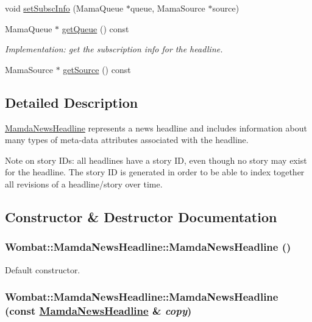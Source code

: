 \begin{CompactItemize}
void \hyperlink{classWombat_1_1MamdaNewsHeadline_e63ea9779d2d075d6bb07fa3ed8e3eae}{set\-Subsc\-Info} (Mama\-Queue $\ast$queue, Mama\-Source $\ast$source)
\item 
Mama\-Queue $\ast$ \hyperlink{classWombat_1_1MamdaNewsHeadline_47ad2837648f2babb3e6d080575e6f8b}{get\-Queue} () const 
\begin{CompactList}\small\item\em Implementation: get the subscription info for the headline. \item\end{CompactList}\item 
Mama\-Source $\ast$ \hyperlink{classWombat_1_1MamdaNewsHeadline_b38caa0375235938ce1258c1bdd3b85b}{get\-Source} () const 
\end{CompactItemize}


\subsection{Detailed Description}
\hyperlink{classWombat_1_1MamdaNewsHeadline}{Mamda\-News\-Headline} represents a news headline and includes information about many types of meta-data attributes associated with the headline. 

Note on story IDs: all headlines have a story ID, even though no story may exist for the headline. The story ID is generated in order to be able to index together all revisions of a headline/story over time. 



\subsection{Constructor \& Destructor Documentation}
\hypertarget{classWombat_1_1MamdaNewsHeadline_17c1e9b410ec2c1a453ecb5e1a911d10}{
\subsubsection[MamdaNewsHeadline]{\setlength{\rightskip}{0pt plus 5cm}Wombat::Mamda\-News\-Headline::Mamda\-News\-Headline ()}}
\label{classWombat_1_1MamdaNewsHeadline_17c1e9b410ec2c1a453ecb5e1a911d10}


Default constructor. 

\hypertarget{classWombat_1_1MamdaNewsHeadline_64a25a7f1f0400d6b75732d906348842}{
\subsubsection[MamdaNewsHeadline]{\setlength{\rightskip}{0pt plus 5cm}Wombat::Mamda\-News\-Headline::Mamda\-News\-Headline (const \hyperlink{classWombat_1_1MamdaNewsHeadline}{Mamda\-News\-Headline} \& {\em copy})}}
\label{classWombat_1_1MamdaNewsHeadline_64a25a7f1f0400d6b75732d906348842}


